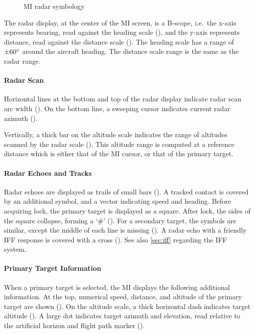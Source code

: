 \begin{figure}[!ht]
  \caption{MI radar symbology}
  \label{fig:mi-radar}
\end{figure}

The radar display, at the center of the MI screen, is a B-scope,
i.e.\ the x-axis represents bearing, read against the heading scale (),
and the y-axis represents distance, read against the distance scale ().
The heading scale has a range of $\pm 60\degree$ around the aircraft heading.
The distance scale range is the same as the radar range.

\paragraph{Radar Scan}
Horizontal lines at the bottom and top of the radar display indicate
radar scan arc width ().
On the bottom line, a sweeping cursor indicates current radar azimuth ().

Vertically, a thick bar on the altitude scale indicates the range of altitudes
scanned by the radar scale ().
This altitude range is computed at a reference distance which is either
that of the MI cursor, or that of the primary target.

\paragraph{Radar Echoes and Tracks}
Radar echoes are displayed as trails of small bars ().
A tracked contact is covered by an additional symbol, and a vector indicating speed and heading.
Before acquiring lock, the primary target is displayed as a square.
After lock, the sides of the square collapse, forming a `\#' ().
For a secondary target, the symbols are similar,
except the middle of each line is missing ().
A radar echo with a friendly IFF response is covered with a cross ().
See also \cref{sec:iff} regarding the IFF system.

\paragraph{Primary Target Information}
When a primary target is selected, the MI displays the following additional information.
At the top, numerical speed, distance, and altitude of the primary target
are shown ().
On the altitude scale, a thick horizontal dash indicates target altitude ().
A large dot indicates target azimuth and elevation, read relative to the artificial horizon
and flight path marker ().

